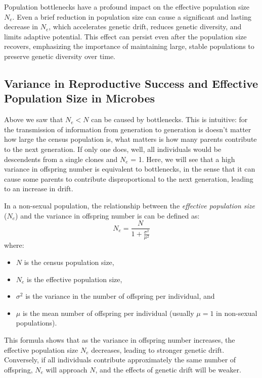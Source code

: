 \documentclass[10pt,a4paper]{scrbook}
\begin{document}
Population bottlenecks have a profound impact on the effective population size \(N_e\). Even a brief reduction in population size can cause a significant and lasting decrease in \(N_e\), which accelerates genetic drift, reduces genetic diversity, and limits adaptive potential. This effect can persist even after the population size recovers, emphasizing the importance of maintaining large, stable populations to preserve genetic diversity over time.


\subsection{Variance in Reproductive Success and Effective Population Size in Microbes}

Above we saw that $N_e < N$ can be caused by bottlenecks. This is intuitive: for the transmission of information from generation to generation is doesn't matter how large the census population is, what matters is how many parents contribute to the next generation. If only one does, well, all individuals would be descendents from a single clones and $N_e$ = 1. Here, we will see that a high variance in offspring number is equivalent to bottlenecks, in the sense that it can cause some parents to contribute disproportional to the next generation, leading to an increase in drift.  

In a non-sexual population, the relationship between the \emph{effective population size} (\(N_e\)) and the variance in offspring number is can be defined as:
\begin{equation}
\label{Eq1}
N_e = \frac{N}{1 + \frac{\sigma^2}{\mu^2}}
\end{equation}
where:
\begin{itemize}
    \item \(N\) is the census population size,
    \item \(N_e\) is the effective population size,
    \item \(\sigma^2\) is the variance in the number of offspring per individual, and
    \item \(\mu\) is the mean number of offspring per individual (usually \(\mu = 1\) in non-sexual populations).
\end{itemize}

This formula shows that as the variance in offspring number increases, the effective population size \(N_e\) decreases, leading to stronger genetic drift. Conversely, if all individuals contribute approximately the same number of offspring, \(N_e\) will approach \(N\), and the effects of genetic drift will be weaker.
\end{document}
